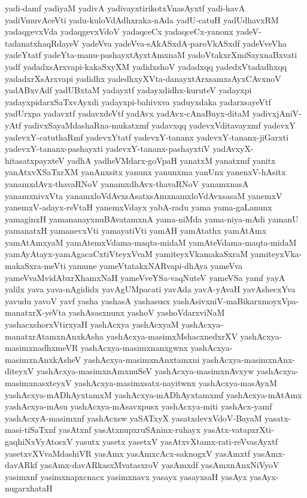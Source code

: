 {yadi-damf
yadiyaM
yadivA
yadivayxtirikotxVnasAyxtf
yadi-havA
yadiVmuvAceVti
yadu-kuloVdAdhxraka-nAda
yadU-catuH
yadUdhavxRM
yadaqgevxVda
yadaqgevxVdoV
yadaqceCx
yadaqceCx-yanonx
yadeV-tadanatxhaqRdayeV
yadeVva
yadeVva-sAkASxdA-paroVkASxdf
yadeVveVha
yadeYtatf
yadeYta-manu-pashayxtAyxtAmxnaM
yadoVtakxrXmiSayxnaBxvati
yadf
yadadxsArxvapi-kakaSxyXM
yadidxshoV
yadadxqq
yadedxVtadadhxqq
yadadxrXsArxvapi
yadidhx
yadedhxyXVta-danayxtArxsamxsAyxCAvxnoV
yadABxvAdf
yadUBxtaM
yadayxtf
yadayxdidhx-kuruteV
yadayxpi
yadayxpidarxSaTxvAyxdi
yadayxpi-bahivxva
yaduyxdaka
yadarxsayeVtf
yadUrxpa
yadavxtf
yadavxdeVtf
yadAvx
yadAvx-cAnaBuyx-ditaM
yadivxjAniV-yAtf
yadivxSayaMdashaRna-mukatxmf
yadavxqq
yadevxVditavayxmf
yadevxY
yadevxY-catuthaRmf
yadevxYtatf
yadevxY-tananx
yadevxY-tananx-jiGarxti
yadevxY-tananx-pashayxti
yadevxY-tananx-pashayxtiV
yadAvxyX-hitasatxpayxteV
yadhA
yadheVMdarx-goVpaH
yanatxM
yanatxmf
yanitx
yanAtxvXSaTxrXM
yanAnxsitx
yanunx
yanunxma
yanUnx
yanenxV-hAsitx
yanamxdAvx-thavaRNoV
yanamxdhAvx-thavaRNoV
yanamxnasA
yanamxnivxVta
yanamxloVdAvxsAsatxsAmxnamxloVdAvxsasaM
yanemxV
yanemxV-adayx-reVtaH
yanemxVdayx
yabA-radu
yama
yama-gaLanunx
yamaginxH
yamananayxnuBAvatamxnA
yama-niMda
yama-niya-mAdi
yamanU
yamanatxH
yamanevxVti
yamayatiVti
yamAH
yamAtathx
yamAtAmx
yamAtAmxyaM
yamAtemxVdama-maqta-midaM
yamAteVdama-maqta-midaM
yamAyAtayx-yamAgacaCxtiVteyxVvaM
yamiteyxVkamakaSxraM
yamiteyxVka-makaSxra-meVti
yamune
yameVtatakxNARvapi-dhAya
yameVva
yameVvaMvidAbxrXhamxNaH
yameVveYSa-vaqNuteV
yameVSa
yamf
yayA
yalilx
yava
yava-nAgididx
yavAgUMpacati
yavAda
yavA-yAvaH
yavAshecxYva
yavudu
yavoV
yavf
yasha
yashasA
yashasusx
yashAsivxniV-maBikarxmoyxVpa-manatxrX-yeVta
yashAsasxnunx
yashoV
yashoVdarxviNaM
yashacxshorxVtirxyaH
yashAcxya
yashAcxyaM
yashAcxya-manatxrAtamxnAnxkAsha
yashAcxya-masimxMshacxnedxrXV
yashAcxya-masimxnadhxmeVR
yashAcxya-masimxnanxgwnx
yashAcxya-masimxnAnxkAsheV
yashAcxya-masimxnAnxtamxni
yashAcxya-masimxnAnx-diteyxV
yashAcxya-masimxnAmxnuSeV
yashAcxya-masimxnAvxyw
yashAcxya-masimxnasxteyxV
yashAcxya-masimxsatx-nayitwnx
yashAcxya-masAyxM
yashAcxya-mADhAyxtamxM
yashAcxya-mADhAyxtamxmf
yashAcxya-mAtAmx
yashAcxya-mAsu
yashAcxya-mAsavxpusx
yashAcxya-miti
yashAcx-yamf
yashAcxyA-masimxnf
yashAcxsw
yaSATxyX
yasatxdevxVdoV-BayaM
yasatx-masi-tiSaTxnf
yasAtxnf
yasAtxnupxruSAninx-ruhayx
yasAtx-vatapxrXti-gaqhiNxVyAtosxV
yasutx
yasetx
yasetxV
yasAtxvXtamx-rati-reVvasAyxtf
yasetxvXVvaMdashiVR
yasAmx
yasAmxcAcx-saknogxV
yasAmxtf
yasAmx-davARkf
yasAmx-davARkasxMvatasxroV
yasAmxdf
yasAmxnAnxNiVyoV
yasimxnf
yasimxnapxcnacx
yasimxnavx
yasayx
yasayxsaH
yasAyx
yasAyx-nugarxhataH
}
